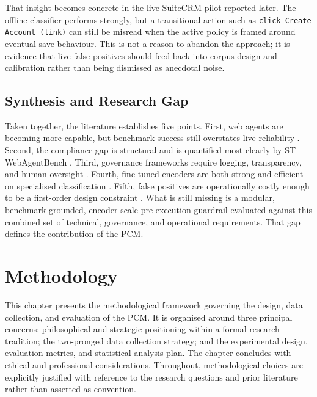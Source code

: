 \documentclass[12pt,a4paper]{article}
\begin{document}
That insight becomes concrete in the live SuiteCRM pilot reported later. The
offline classifier performs strongly, but a transitional action such as
\texttt{click Create Account (link)} can still be misread when the active policy
is framed around eventual save behaviour. This is not a reason to abandon the
approach; it is evidence that live false positives should feed back into corpus
design and calibration rather than being dismissed as anecdotal noise.

\subsection{Synthesis and Research Gap}
\label{sec:synthesis}

Taken together, the literature establishes five points. First, web agents are
becoming more capable, but benchmark success still overstates live reliability
\citep{xue2025illusion}. Second, the compliance gap is structural and is
quantified most clearly by ST-WebAgentBench \citep{levy2026stwebagentbench}.
Third, governance frameworks require logging, transparency, and human oversight
\citep{euaiact2024,nist2023rmf,iso2023}. Fourth, fine-tuned encoders are both
strong and efficient on specialised classification
\citep{bucher2024finetuned,zheng2025lightweight}. Fifth, false positives are
operationally costly enough to be a first-order design constraint
\citep{alahmadi2022fps,ghimire2025aml}. What is still missing is a modular,
benchmark-grounded, encoder-scale pre-execution guardrail evaluated against this
combined set of technical, governance, and operational requirements. That gap
defines the contribution of the PCM.


\newpage
\setcounter{section}{2}
\section{Methodology}
\label{ch:methodology}

This chapter presents the methodological framework governing the design, data
collection, and evaluation of the PCM. It is organised around three principal
concerns: philosophical and strategic positioning within a formal research
tradition; the two-pronged data collection strategy; and the experimental design,
evaluation metrics, and statistical analysis plan. The chapter concludes with
ethical and professional considerations. Throughout, methodological choices are
explicitly justified with reference to the research questions and prior literature
rather than asserted as convention.
\end{document}

